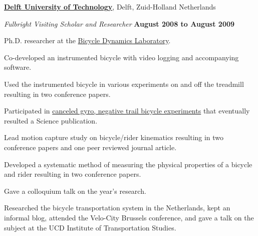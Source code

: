 \documentclass[10pt]{article}
\newenvironment{outerlist}[1][\enskip\textbullet]%
        {\begin{itemize}[#1]}{\end{itemize}%
         \vspace{-.6\baselineskip}}
\newenvironment{innerlist}[1][\enskip\textbullet]%
        {\begin{compactitem}[#1]}{\end{compactitem}}
\newcommand{\blankline}{\quad\pagebreak[2]}
\begin{document}
\blankline

\href{http://www.tudelft.nl}{\textbf{Delft University of Technology}}, Delft, Zuid-Holland Netherlands
\begin{outerlist}
  \item[] \textit{Fulbright Visiting Scholar and Researcher}%
        \hfill \textbf{August 2008 to August 2009}
  \begin{innerlist}
    \item Ph.D. researcher at the \href{http://bicycle.tudelft.nl}{Bicycle Dynamics Laboratory}.
    \item Co-developed an instrumented bicycle with video logging and
        accompanying software.
    \item Used the instrumented bicycle in various experiments on and off the
        treadmill resulting in two conference papers.
    \item Participated in
        \href{http://dx.doi.org/10.1126/science.1201959}{canceled gyro,
        negative trail bicycle experiments} that eventually resulted a Science
        publication.
    \item Lead motion capture study on bicycle/rider kinematics resulting in
        two conference papers and one peer reviewed journal article.
    \item Developed a systematic method of measuring the physical properties of
        a bicycle and rider resulting in two conference papers.
    \item Gave a colloquium talk on the year's research.
    \item Researched the bicycle transportation system in the Netherlands, kept
        an informal blog, attended the Velo-City Brussels conference, and gave
        a talk on the subject at the UCD Institute of Transportation Studies.
  \end{innerlist}
\end{outerlist}
\end{document}
